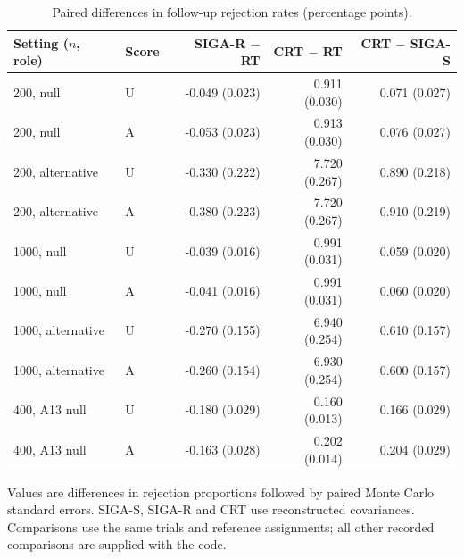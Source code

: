 \begin{table}[!htbp]
\centering
\caption{Paired differences in follow-up rejection rates (percentage points).}
\label{tab:supp-focused-paired}
\begin{threeparttable}
\begin{singlespace}
\small
\setlength{\tabcolsep}{3.5pt}
\renewcommand{\arraystretch}{1.1}
\begin{tabular}{@{}llrrr@{}}
\toprule
Setting ($n$, role) & Score & SIGA-R $-$ RT & CRT $-$ RT & CRT $-$ SIGA-S\\
\midrule
200, null & U & -0.049 (0.023) & 0.911 (0.030) & 0.071 (0.027) \\
200, null & A & -0.053 (0.023) & 0.913 (0.030) & 0.076 (0.027) \\
200, alternative & U & -0.330 (0.222) & 7.720 (0.267) & 0.890 (0.218) \\
200, alternative & A & -0.380 (0.223) & 7.720 (0.267) & 0.910 (0.219) \\
1000, null & U & -0.039 (0.016) & 0.991 (0.031) & 0.059 (0.020) \\
1000, null & A & -0.041 (0.016) & 0.991 (0.031) & 0.060 (0.020) \\
1000, alternative & U & -0.270 (0.155) & 6.940 (0.254) & 0.610 (0.157) \\
1000, alternative & A & -0.260 (0.154) & 6.930 (0.254) & 0.600 (0.157) \\
400, A13 null & U & -0.180 (0.029) & 0.160 (0.013) & 0.166 (0.029) \\
400, A13 null & A & -0.163 (0.028) & 0.202 (0.014) & 0.204 (0.029) \\
\bottomrule
\end{tabular}
\begin{tablenotes}[flushleft]\footnotesize
\item[] Values are differences in rejection proportions followed by paired Monte Carlo standard errors. SIGA-S, SIGA-R and CRT use reconstructed covariances. Comparisons use the same trials and reference assignments; all other recorded comparisons are supplied with the code.
\end{tablenotes}
\end{singlespace}
\end{threeparttable}
\end{table}
